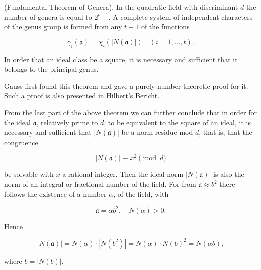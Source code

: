 (Fundamental Theorem of Genera). In the quadratic field with discriminant $d$ the number of genera is equal to $2^{t-1}$. A complete system of independent characters of the genus group is formed from any $t-1$ of the functions

$$\gamma_i(\mathfrak{a}) = \chi_i(|N(\mathfrak{a})|) \quad (i = 1, \ldots, t).$$

In order that an ideal class be a square, it is necessary and sufficient that it belongs to the principal genus.

Gauss first found this theorem and gave a purely number-theoretic proof for it. Such a proof is also presented in Hilbert’s Bericht.

From the last part of the above theorem we can further conclude that in order for the ideal $\mathfrak{a}$, relatively prime to $d$, to be equivalent to the square of an ideal, it is necessary and sufficient that $|N(\mathfrak{a})|$ be a norm residue mod $d$, that is, that the congruence

$$|N(\mathfrak{a})| \equiv x^2 \pmod{d}$$

be solvable with $x$ a rational integer. Then the ideal norm $|N(\mathfrak{a})|$ is also the norm of an integral or fractional number of the field. For from $\mathfrak{a} \approx b^2$ there follows the existence of a number $\alpha$, of the field, with

$$\mathfrak{a} = \alpha b^2, \quad N(\alpha) > 0.$$

Hence

$$|N(\mathfrak{a})| = N(\alpha) \cdot |N(b^2)| = N(\alpha) \cdot N(b)^2 = N(\alpha b),$$

where $b = |N(b)|$.
